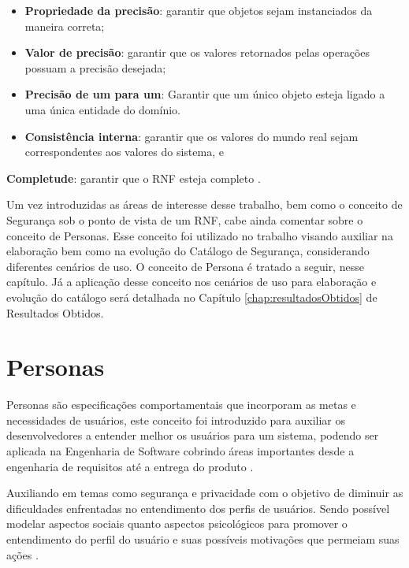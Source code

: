 \begin{itemize}
	\item \textbf{Propriedade da precisão}: garantir que objetos sejam instanciados da maneira correta; 
	
	\item \textbf{Valor de precisão}: garantir que os valores retornados pelas operações possuam a precisão desejada;
	
	\item \textbf{Precisão de um para um}: Garantir que um único objeto esteja ligado a uma única entidade do domínio. 
	
	\item \textbf{Consistência interna}: garantir que os valores do mundo real sejam correspondentes aos valores do sistema, e
\end{itemize}

\textbf{Completude}: garantir que o RNF esteja completo \cite{chung2012non}. 

Um vez introduzidas as áreas de interesse  desse trabalho, bem como o conceito de Segurança sob o ponto de vista de um RNF, cabe ainda comentar sobre o conceito de Personas. Esse conceito foi utilizado no trabalho visando auxiliar na elaboração bem como na evolução do Catálogo de Segurança, considerando diferentes cenários de uso. O conceito de Persona é tratado a seguir, nesse capítulo. Já a aplicação desse conceito nos cenários de uso para elaboração e evolução do catálogo será detalhada no Capítulo \ref{chap:resultadosObtidos} de Resultados Obtidos.

\section{Personas}
\label{sec:personas}

Personas são especificações comportamentais que incorporam as metas e necessidades de usuários, este conceito foi introduzido para auxiliar os desenvolvedores a entender melhor os usuários para um sistema, podendo ser aplicada na Engenharia de Software cobrindo áreas importantes desde a engenharia de requisitos até a entrega do produto \cite{ford2017characterizing}. 

Auxiliando em temas como segurança e privacidade com o objetivo de diminuir as dificuldades enfrentadas no entendimento dos perfis de usuários. Sendo possível modelar aspectos sociais quanto aspectos psicológicos para promover o entendimento do perfil do usuário e suas possíveis motivações que permeiam suas ações \cite{ford2017characterizing} \cite{daelaboraccao}. 

